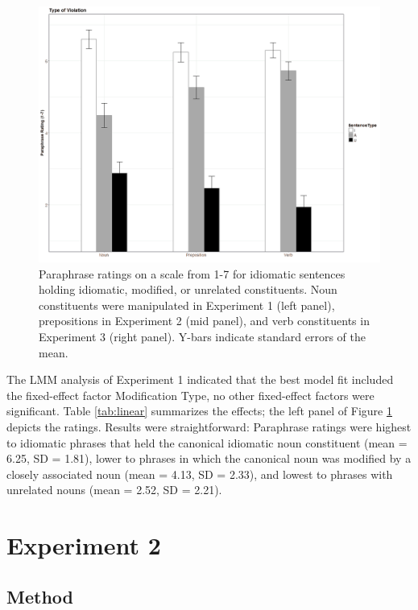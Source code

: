\documentclass[output=paper]{langsci/langscibook}
\begin{document}
\begin{figure}
  \includegraphics[width=\linewidth]{figures/Figure 1.png}
  \caption{Paraphrase ratings on a scale from 1-7 for idiomatic sentences holding idiomatic, modified, or unrelated constituents. Noun constituents were manipulated in Experiment 1 (left panel), prepositions in Experiment 2 (mid panel), and verb constituents in Experiment 3 (right panel). Y-bars indicate standard errors of the mean.}
  \label{fig:chart}
\end{figure}

The LMM analysis of Experiment 1 indicated that the best model fit included the fixed-effect factor Modification Type, no other fixed-effect factors were significant.  Table \ref{tab:linear} summarizes the effects; the left panel of Figure \ref{fig:chart} depicts the ratings. Results were straightforward: Paraphrase ratings were highest to idiomatic phrases that held the canonical idiomatic noun constituent (mean = 6.25, SD = 1.81), lower to phrases in which the canonical noun was modified by a closely associated noun (mean = 4.13, SD = 2.33), and lowest to phrases with unrelated nouns (mean = 2.52, SD = 2.21).

\section{Experiment 2}

\subsection{Method}
\end{document}
